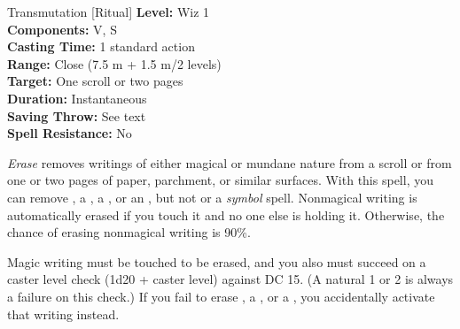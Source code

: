 {Transmutation [Ritual]}
{
	\textbf{Level:}
	Wiz 1\\
	\textbf{Components:}
	V, S\\
	\textbf{Casting Time:}
	1 standard action\\
	\textbf{Range:}
	Close (7.5 m + 1.5 m/2 levels)\\
	\textbf{Target:}
	One scroll or two pages\\
	\textbf{Duration:}
	Instantaneous\\
	\textbf{Saving Throw:}
	See text\\
	\textbf{Spell Resistance:}
	No\\
}
{
	\emph{Erase} removes writings of either magical or mundane nature from a scroll or from one or two pages of paper, parchment, or similar surfaces. With this spell, you can remove , a , a , or an , but not  or a \emph{symbol} spell. Nonmagical writing is automatically erased if you touch it and no one else is holding it. Otherwise, the chance of erasing nonmagical writing is 90\%.

	Magic writing must be touched to be erased, and you also must succeed on a caster level check (1d20 + caster level) against DC 15. (A natural 1 or 2 is always a failure on this check.) If you fail to erase , a , or a , you accidentally activate that writing instead.

}
